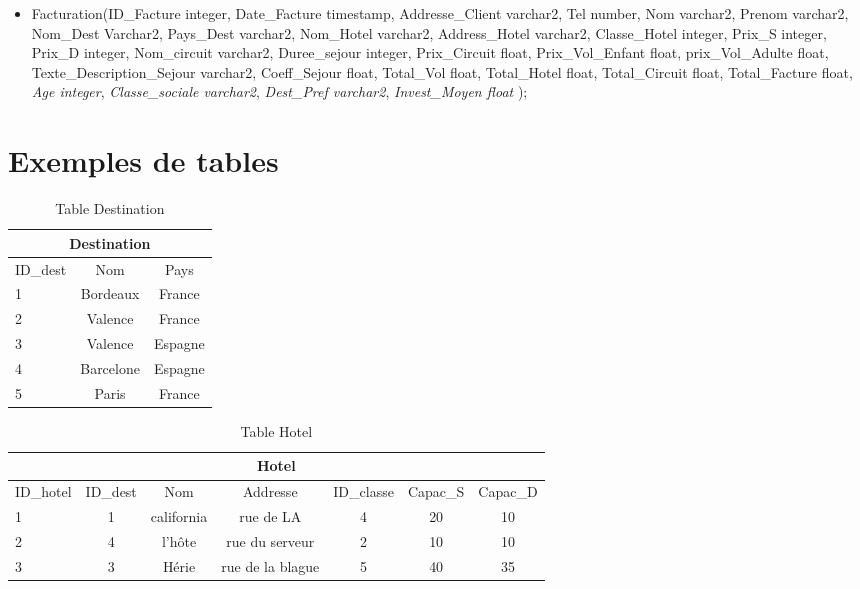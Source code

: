 \documentclass[10pt]{article}
\begin{document}
\begin{itemize}
\item Facturation(ID\_Facture integer, Date\_Facture timestamp, Addresse\_Client varchar2, Tel number, Nom varchar2, Prenom varchar2, Nom\_Dest Varchar2, Pays\_Dest varchar2, Nom\_Hotel varchar2, Address\_Hotel varchar2, Classe\_Hotel integer, Prix\_S integer, Prix\_D integer, Nom\_circuit varchar2, Duree\_sejour integer, Prix\_Circuit float, Prix\_Vol\_Enfant float, prix\_Vol\_Adulte float, Texte\_Description\_Sejour varchar2, Coeff\_Sejour float, Total\_Vol float, Total\_Hotel float,  Total\_Circuit float, Total\_Facture float, \textit{Age integer}, \textit{Classe\_sociale varchar2}, \textit{Dest\_Pref varchar2}, \textit{Invest\_Moyen float} );\\
\end{itemize}

\section{Exemples de tables}


\begin{table}[h]
\begin{center}
\begin{tabular}{|l|c|c|}
\hline
\multicolumn{3}{|c|}{Destination}\\
\hline
ID\_dest& Nom & Pays \\
\hline
1 & Bordeaux& France\\
\hline
2 & Valence& France\\
\hline
3 & Valence& Espagne\\
\hline
4 & Barcelone& Espagne\\
\hline
5 & Paris& France\\
\hline
\end{tabular}
\end{center}
\caption{Table Destination}
\end{table}


\begin{table}[h]
\begin{center}
\begin{tabular}{|l|c|c|c|c|c|c|}
\hline
\multicolumn{7}{|c|}{Hotel}\\
\hline
ID\_hotel& ID\_dest& Nom & Addresse &ID\_classe & Capac\_S & Capac\_D  \\
\hline
1 & 1& california&rue de LA& 4 & 20 & 10\\
\hline
2 & 4& l'hôte&rue du serveur& 2 & 10 & 10\\
\hline
3 & 3& Hérie&rue de la blague& 5 & 40 & 35\\
\hline
\end{tabular}
\end{center}
\caption{Table Hotel}
\end{table}
\newpage
\end{document}

